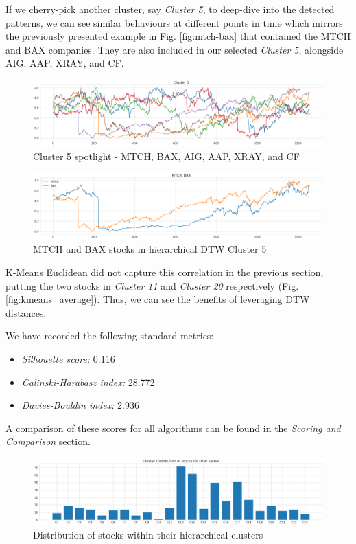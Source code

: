 \documentclass[11pt]{article}
\begin{document}
If we cherry-pick another cluster, say \textit{Cluster 5}, to deep-dive into the detected patterns, we can see similar behaviours at different points in time which mirrors the previously presented example in Fig. \ref{fig:mtch-bax} that contained the MTCH and BAX companies. They are also included in our selected \textit{Cluster 5}, alongside AIG, AAP, XRAY, and CF.

\begin{figure}[H]
\centering
\includegraphics[width=12cm]{img/kernel-cluster5.png} 
\caption{Cluster 5 spotlight - MTCH, BAX, AIG, AAP, XRAY, and CF}
\label{fig:kernel-cluster5}
\end{figure}

\begin{figure}[H] 
\centering
\includegraphics[width=12cm]{img/mtch-bax.png} 
\caption{MTCH and BAX stocks in hierarchical DTW Cluster 5}
\end{figure}

K-Means Euclidean did not capture this correlation in the previous section, putting the two stocks in \textit{Cluster 11} and \textit{Cluster 20} respectively (Fig. \ref{fig:kmeans_average}). Thus, we can see the benefits of leveraging DTW distances.

We have recorded the following standard metrics:
\begin{itemize}
    \item \textit{Silhouette score:} 0.116
    \item \textit{Calinski-Harabasz index:} 28.772
    \item \textit{Davies-Bouldin index:} 2.936
\end{itemize}

A comparison of these scores for all algorithms can be found in the \textit{\hyperref[sec:compare]{Scoring and Comparison}} section.


\begin{figure}[H]
\centering
\includegraphics[width=12cm]{img/kernel-dtw-stock-distrib.png} 
\caption{Distribution of stocks within their hierarchical clusters}
\label{fig:kmeans_dtw_dist}
\end{figure}
\end{document}
